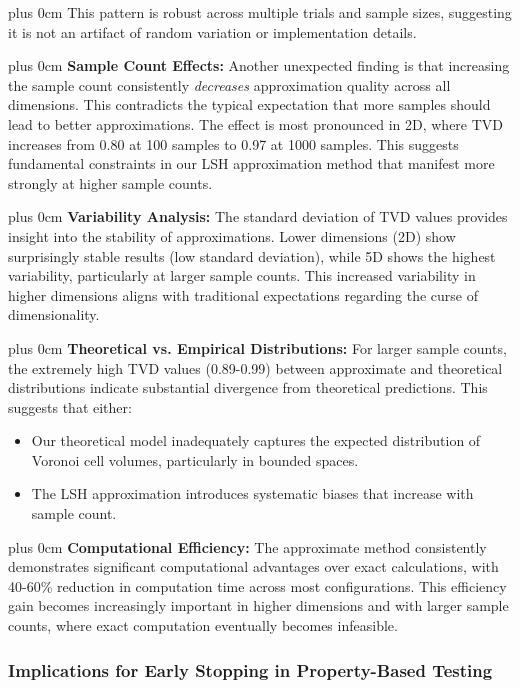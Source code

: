\documentclass[11pt,a4paper]{article}
\newcommand{\justifytext}{\leftskip=0pt \rightskip=0pt plus 0cm}
\begin{document}
\justifytext
This pattern is robust across multiple trials and sample sizes, suggesting it is not an artifact of random variation or implementation details.

\justifytext
\textbf{Sample Count Effects:} Another unexpected finding is that increasing the sample count consistently \textit{decreases} approximation quality across all dimensions. This contradicts the typical expectation that more samples should lead to better approximations. The effect is most pronounced in 2D, where TVD increases from 0.80 at 100 samples to 0.97 at 1000 samples. This suggests fundamental constraints in our LSH approximation method that manifest more strongly at higher sample counts.

\justifytext
\textbf{Variability Analysis:} The standard deviation of TVD values provides insight into the stability of approximations. Lower dimensions (2D) show surprisingly stable results (low standard deviation), while 5D shows the highest variability, particularly at larger sample counts. This increased variability in higher dimensions aligns with traditional expectations regarding the curse of dimensionality.

\justifytext
\textbf{Theoretical vs. Empirical Distributions:} For larger sample counts, the extremely high TVD values (0.89-0.99) between approximate and theoretical distributions indicate substantial divergence from theoretical predictions. This suggests that either:
\begin{itemize}
    \item Our theoretical model inadequately captures the expected distribution of Voronoi cell volumes, particularly in bounded spaces.
    \item The LSH approximation introduces systematic biases that increase with sample count.
\end{itemize}

\justifytext
\textbf{Computational Efficiency:} The approximate method consistently demonstrates significant computational advantages over exact calculations, with 40-60\% reduction in computation time across most configurations. This efficiency gain becomes increasingly important in higher dimensions and with larger sample counts, where exact computation eventually becomes infeasible.

\subsubsection{Implications for Early Stopping in Property-Based Testing}
\end{document}

